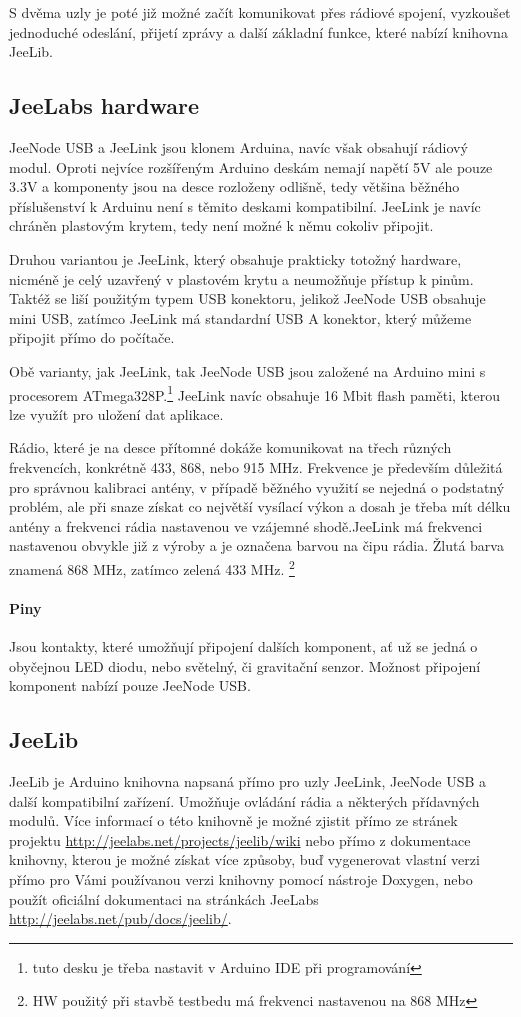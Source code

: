 \documentclass[12pt,titlepage]{article}
\begin{document}
	S dvěma uzly je poté již možné začít komunikovat přes rádiové spojení, vyzkoušet jednoduché odeslání, přijetí zprávy a další základní funkce, které nabízí knihovna JeeLib.


	\subsection{JeeLabs hardware}
		JeeNode USB a JeeLink jsou klonem Arduina, navíc však obsahují rádiový modul. Oproti nejvíce rozšířeným Arduino deskám nemají napětí 5V ale pouze 3.3V  a komponenty jsou na desce rozloženy odlišně, tedy většina běžného příslušenství k Arduinu není s těmito deskami kompatibilní. JeeLink je navíc chráněn plastovým krytem, tedy není možné k němu cokoliv připojit.

		Druhou variantou je JeeLink, který obsahuje prakticky totožný hardware, nicméně je celý uzavřený v plastovém krytu a neumožňuje přístup k pinům. Taktéž se liší použitým typem USB konektoru, jelikož JeeNode USB obsahuje mini USB, zatímco JeeLink má standardní USB A konektor, který můžeme připojit přímo do počítače.

		Obě varianty, jak JeeLink, tak JeeNode USB jsou založené na Arduino mini s procesorem ATmega328P.\footnote{tuto desku je třeba nastavit v Arduino IDE při programování} JeeLink navíc obsahuje 16 Mbit flash paměti, kterou lze využít pro uložení dat aplikace.

		Rádio, které je na desce přítomné dokáže komunikovat na třech různých frekvencích, konkrétně 433, 868, nebo 915 MHz. Frekvence je především důležitá pro správnou kalibraci antény, v případě běžného využití se nejedná o podstatný problém, ale při snaze získat co největší vysílací výkon a dosah je třeba mít délku antény a frekvenci rádia nastavenou ve vzájemné shodě.JeeLink má frekvenci nastavenou obvykle již z výroby a je označena barvou na čipu rádia. Žlutá barva znamená 868 MHz, zatímco zelená 433 MHz. \footnote{HW použitý při stavbě testbedu má frekvenci nastavenou na 868 MHz}
		\paragraph{Piny}

		Jsou kontakty, které umožňují připojení dalších komponent, ať už se jedná o obyčejnou LED diodu, nebo světelný, či gravitační senzor. Možnost připojení komponent nabízí pouze JeeNode USB.

	\subsection{JeeLib}
		JeeLib je Arduino knihovna napsaná přímo pro uzly JeeLink, JeeNode USB a další kompatibilní zařízení. Umožňuje ovládání rádia a některých přídavných modulů. Více informací o této knihovně je možné zjistit přímo ze stránek projektu \url{http://jeelabs.net/projects/jeelib/wiki} nebo přímo z dokumentace knihovny, kterou je možné získat více způsoby, buď vygenerovat vlastní verzi přímo pro Vámi používanou verzi knihovny pomocí nástroje Doxygen, nebo použít oficiální dokumentaci na stránkách JeeLabs \url{http://jeelabs.net/pub/docs/jeelib/}.
\end{document}
